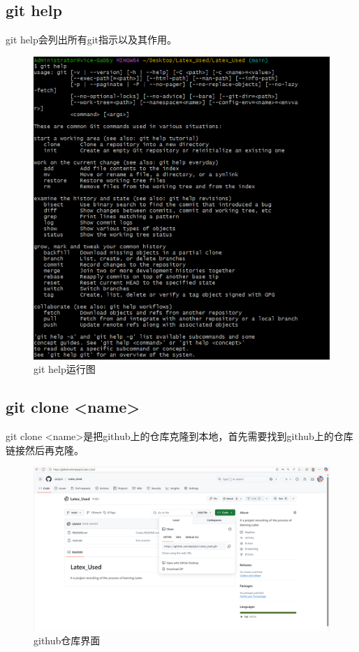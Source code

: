\documentclass{article}
\begin{document}
\subsection{git help}
git help会列出所有git指示以及其作用。
\begin{figure}[H]
    \centering
    \includegraphics[width=1\linewidth]{git_help.png}
    \caption{git help运行图}
    \label{fig:help}
\end{figure}

\subsection{git clone <name>}
git clone <name>是把github上的仓库克隆到本地，首先需要找到github上的仓库链接然后再克隆。
\begin{figure}[H]
    \centering
    \includegraphics[width=1\linewidth]{find_github.png}
    \caption{github仓库界面}
    \label{fig:clone}
\end{figure}
\end{document}
